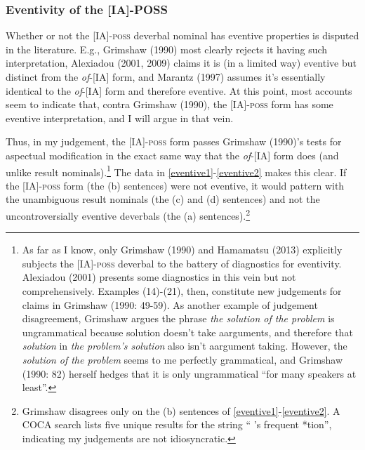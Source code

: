 \documentclass[12pt]{article}
\begin{document}
\subsubsection{Eventivity of the [IA]-POSS}\label{facts3.1}

Whether or not the [IA]-\textsc{poss} deverbal nominal has eventive properties is disputed in the literature. E.g., Grimshaw (1990) most clearly rejects it having such interpretation, Alexiadou (2001, 2009) claims it is (in a limited way) eventive but distinct from the \textit{of}-[IA] form, and Marantz (1997) assumes it's essentially identical to the \textit{of}-[IA] form and therefore eventive. At this point, most accounts seem to indicate that, contra Grimshaw (1990), the [IA]-\textsc{poss} form has some eventive interpretation, and I will argue in that vein.

Thus, in my judgement, the [IA]-\textsc{poss} form passes Grimshaw (1990)'s tests for aspectual modification in the exact same way that the \textit{of}-[IA] form does (and unlike result nominals).\footnote{ As far as I know, only Grimshaw (1990) and Hamamatsu (2013) explicitly subjects the [IA]-\textsc{poss} deverbal to the battery of diagnostics for eventivity. Alexiadou (2001) presents some diagnostics in this vein but not comprehensively. Examples (14)-(21), then, constitute new judgements for claims in Grimshaw (1990: 49-59). As another example of judgement disagreement, Grimshaw argues the phrase \textit{the solution of the problem} is ungrammatical because solution doesn’t take aarguments, and therefore that \textit{solution} in \textit{the problem’s solution} also isn’t aargument taking. However, the \textit{solution of the problem} seems to me perfectly grammatical, and Grimshaw (1990: 82) herself hedges that it is only ungrammatical “for many speakers at least”.} The data in \ref{eventive1}-\ref{eventive2} makes this clear. If the [IA]-\textsc{poss} form (the (b) sentences) were not eventive, it would pattern with the unambiguous result nominals (the (c) and (d) sentences) and not the uncontroversially eventive deverbals (the (a) sentences).\footnote{ Grimshaw disagrees only on the (b) sentences of \ref{eventive1}-\ref{eventive2}. A COCA search lists five unique results for the string “ ’s frequent *tion”, indicating my judgements are not idiosyncratic.}
\end{document}
